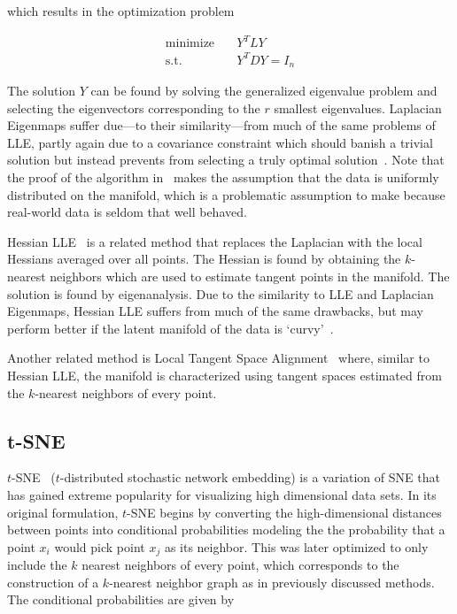 which results in the optimization problem

\begin{align}
    \text{minimize} \quad & Y^TLY \\
    \text{s.t.} \quad & Y^TDY = I_n
\end{align}

The solution $Y$ can be found by solving the generalized eigenvalue problem and
selecting the eigenvectors corresponding to the $r$ smallest eigenvalues.
Laplacian Eigenmaps suffer due---to their similarity---from much of the same
problems of LLE, partly again due to a covariance constraint which should
banish a trivial solution but instead prevents from selecting a truly optimal
solution~\cite{vandermaaten_review}. Note that the proof of the algorithm
in~\cite{leigs} makes the assumption that the data is uniformly distributed on
the manifold, which is a problematic assumption to make because real-world data
is seldom that well behaved.

Hessian LLE~\cite{hlle} is a related method that replaces the Laplacian with
the local Hessians averaged over all points. The Hessian is found by obtaining
the $k$-nearest neighbors which are used to estimate tangent points in the manifold.
The solution is found by eigenanalysis. Due to the similarity to LLE and Laplacian Eigenmaps,
Hessian LLE suffers from much of the same drawbacks, but may perform better if the
latent manifold of the data is `curvy'~\cite{vandermaaten_review}.

Another related method is Local Tangent Space Alignment~\cite{ltsa} where, similar to
Hessian LLE, the manifold is characterized using tangent spaces estimated from the $k$-nearest
neighbors of every point.

\subsection{t-SNE}

$t$-SNE~\cite{tsne} ($t$-distributed stochastic network embedding) is a
variation of SNE that has gained extreme popularity for visualizing high
dimensional data sets. In its original formulation, $t$-SNE begins by
converting the high-dimensional distances between points into conditional
probabilities modeling the the probability that a point $x_i$ would pick point
$x_j$ as its neighbor. This was later optimized to only include the $k$ nearest
neighbors of every point, which corresponds to the construction of a
$k$-nearest neighbor graph as in previously discussed methods. The conditional probabilities are
given by

